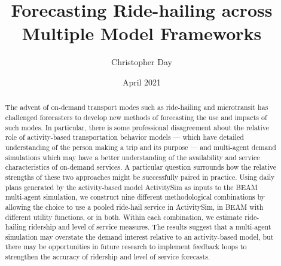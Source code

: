 \documentclass[fancy, masters]{byuthesis}
\title{Forecasting Ride-hailing across\\
\hspace*{0.333em}Multiple Model Frameworks}
\author{Christopher Day}
\date{April 2021}
\begin{document}
	\frontmatter

	\titlepage
	\clearpage

	\customtitlepage
	\clearpage


    \begin{abstract}
  The advent of on-demand transport modes such as ride-hailing and microtransit has challenged forecasters to develop new methods of forecasting the use and impacts of such modes. In particular, there is some professional disagreement about the relative role of activity-based transportation behavior models --- which have detailed understanding of the person making a trip and its purpose --- and multi-agent demand simulations which may have a better understanding of the availability and service characteristics of on-demand services. A particular question surrounds how the relative strengths of these two approaches might be successfully paired in practice. Using daily plans generated by the activity-based model ActivitySim as inputs to the BEAM multi-agent simulation, we construct nine different methodological combinations by allowing the choice to use a pooled ride-hail service in ActivitySim, in BEAM with different utility functions, or in both. Within each combination, we estimate ride-hailing ridership and level of service measures. The results suggest that a multi-agent simulation may overstate the demand interest relative to an activity-based model, but there may be opportunities in future research to implement feedback loops to strengthen the accuracy of ridership and level of service forecasts.
  \end{abstract}
  	\clearpage
\end{document}
